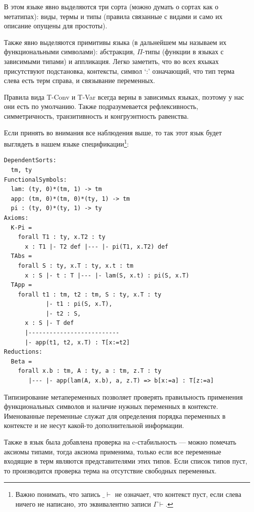 В этом языке явно выделяются три сорта (можно думать о сортах как о метатипах): виды, термы и типы (правила связанные с видами и само их описание опущены для простоты).

Также явно выделяются примитивы языка (в дальнейшем мы называем их функциональными символами):
абстракция, $\Pi$-типы (функции в языках с зависимыми типами) и аппликация. Легко заметить, что во всех яхыках присутствуют подстановка, контексты, символ `:' означающий, что тип терма слева есть терм справа, и связывание переменных.

Правила вида T-Conv и T-Var всегда верны в зависимых языках, поэтому у нас они есть по умолчанию. Также подразумевается рефлексивность, симметричность, транзитивность и конгруэнтность равенства.

Если принять во внимания все наблюдения выше, то так этот язык будет выглядеть в нашем языке спецификации\footnote{Важно понимать, что запись $\_ \vdash$ не означает, что контекст пуст, если слева ничего не написано, это эквивалентно записи $\Gamma \vdash$.}:

\begin{lstlisting}[frame=single]
DependentSorts:
  tm, ty
FunctionalSymbols:
  lam: (ty, 0)*(tm, 1) -> tm
  app: (tm, 0)*(tm, 0)*(ty, 1) -> tm
  pi : (ty, 0)*(ty, 1) -> ty
Axioms:
  K-Pi =
    forall T1 : ty, x.T2 : ty
      x : T1 |- T2 def |--- |- pi(T1, x.T2) def
  TAbs =
    forall S : ty, x.T : ty, x.t : tm
      x : S |- t : T |--- |- lam(S, x.t) : pi(S, x.T)
  TApp =
    forall t1 : tm, t2 : tm, S : ty, x.T : ty
            |- t1 : pi(S, x.T),
            |- t2 : S,
      x : S |- T def
      |--------------------------
      |- app(t1, t2, x.T) : T[x:=t2]
Reductions:
  Beta =
    forall x.b : tm, A : ty, a : tm, z.T : ty
       |--- |- app(lam(A, x.b), a, z.T) => b[x:=a] : T[z:=a]
\end{lstlisting}

Типизирование метапеременных позволяет проверять правильность применения функциональных символов и наличие нужных переменных в контексте. Именованные переменные служат для определения порядка переменных в контексте и не несут какой-то дополнительной информации.

Также в язык была добавлена проверка на c-стабильность --- можно помечать аксиомы типами, тогда аксиома применима, только если все переменные входящие в терм являются представителями этих типов. Если список типов пуст, то производится проверка терма на отсутствие свободных переменных.
